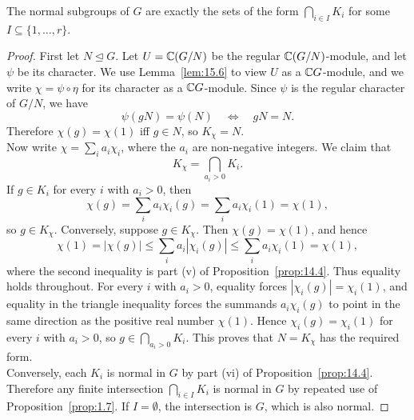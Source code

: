 \documentclass[../Odyssey_Project.tex]{subfiles}
\begin{document}
\begin{proposition}
\label{prop:15.7}
The normal subgroups of $G$ are exactly the sets of the form $\bigcap_{i \in I} K_i$ for some $I \subseteq \{1, \ldots, r\}$.
\end{proposition}
\begin{proof}
    First let $N \trianglelefteq G$. Let $U=\mathbb{C}(G/N)$ be the regular $\mathbb{C}(G/N)$-module, and let $\psi$ be its character. We use Lemma~\ref{lem:15.6} to view $U$ as a $\mathbb{C} G$-module, and we write $\chi=\psi\circ\eta$ for its character as a $\mathbb{C} G$-module. Since $\psi$ is the regular character of $G/N$, we have
    \[
        \psi(gN)=\psi(N)
        \quad\Longleftrightarrow\quad
        gN=N.
    \]
    Therefore $\chi(g)=\chi(1)$ iff $g\in N$, so $K_\chi=N$.\\
    Now write $\chi=\sum_i a_i\chi_i$, where the $a_i$ are non-negative integers. We claim that
    \[
        K_\chi=\bigcap_{a_i>0}K_i.
    \]
    If $g\in K_i$ for every $i$ with $a_i>0$, then
    \[
        \chi(g)=\sum_i a_i\chi_i(g)=\sum_i a_i\chi_i(1)=\chi(1),
    \]
    so $g\in K_\chi$. Conversely, suppose $g\in K_\chi$. Then $\chi(g)=\chi(1)$, and hence
    \[
        \chi(1)=|\chi(g)|
        \leq
        \sum_i a_i|\chi_i(g)|
        \leq
        \sum_i a_i\chi_i(1)
        =
        \chi(1),
    \]
    where the second inequality is part (v) of Proposition~\ref{prop:14.4}. Thus equality holds throughout. For every $i$ with $a_i>0$, equality forces $|\chi_i(g)|=\chi_i(1)$, and equality in the triangle inequality forces the summands $a_i\chi_i(g)$ to point in the same direction as the positive real number $\chi(1)$. Hence $\chi_i(g)=\chi_i(1)$ for every $i$ with $a_i>0$, so $g\in\bigcap_{a_i>0}K_i$. This proves that $N=K_\chi$ has the required form.\\
    Conversely, each $K_i$ is normal in $G$ by part (vi) of Proposition~\ref{prop:14.4}. Therefore any finite intersection $\bigcap_{i\in I}K_i$ is normal in $G$ by repeated use of Proposition~\ref{prop:1.7}. If $I=\emptyset$, the intersection is $G$, which is also normal.
\end{proof}
\end{document}
